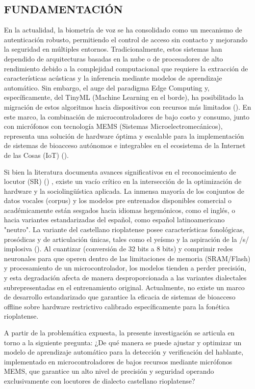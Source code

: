 \subsection{FUNDAMENTACIÓN}

En la actualidad, la biometría de voz se ha consolidado como un mecanismo de autenticación robusto,
permitiendo el control de acceso sin contacto y mejorando la seguridad en múltiples entornos.
Tradicionalmente, estos sistemas han dependido de arquitecturas basadas en la nube o de procesadores
de alto rendimiento debido a la complejidad computacional que requiere la extracción de características
acústicas y la inferencia mediante modelos de aprendizaje automático. Sin embargo, el auge del paradigma
Edge Computing y, específicamente, del TinyML (Machine Learning en el borde), ha posibilitado la
migración de estos algoritmos hacia dispositivos con recursos más limitados (\cite{rayen}). 
En este marco, la combinación de microcontroladores de bajo costo y consumo, junto con micrófonos 
con tecnología MEMS (Sistemas Microelectromecánicos), representa una solución de hardware óptima y 
escalable para la implementación de sistemas de bioacceso autónomos e integrables en el ecosistema 
de la Internet de las Cosas (IoT) (\cite{warden}).

Si bien la literatura documenta avances significativos en el reconocimiento de locutor (SR) 
(\cite{fenu}) , existe un vacío crítico en la intersección de la optimización de hardware
y la sociolingüística aplicada. La inmensa mayoría de los conjuntos de datos vocales (corpus)
y los modelos pre entrenados disponibles comercial o académicamente están sesgados hacia idiomas
hegemónicos, como el inglés, o hacia variantes estandarizadas del español, como  español 
latinoamericano "neutro". La variante del castellano rioplatense posee características
fonológicas, prosódicas y de articulación únicas, tales como el yeísmo y la aspiración de la /s/ 
implosiva (\cite{colantoni}). Al cuantizar (conversión de 32 bits a 8 bits) y comprimir redes 
neuronales para que operen dentro de las limitaciones de memoria (SRAM/Flash) y procesamiento 
de un microcontrolador, los modelos tienden a perder precisión, y esta degradación afecta de 
manera desproporcionada a las variantes dialectales subrepresentadas en el entrenamiento original. 
Actualmente, no existe un marco de desarrollo estandarizado que garantice la eficacia de sistemas 
de bioacceso offline sobre hardware restrictivo calibrado específicamente para la fonética rioplatense.

A partir de la problemática expuesta, la presente investigación se articula en torno a la 
siguiente pregunta: ¿De qué manera se puede ajustar y optimizar un modelo de 
aprendizaje automático para la detección y verificación del hablante, implementado 
en microcontroladores de bajos recursos mediante micrófonos MEMS, que garantice un alto 
nivel de precisión y seguridad operando exclusivamente con locutores de dialecto castellano rioplatense?

